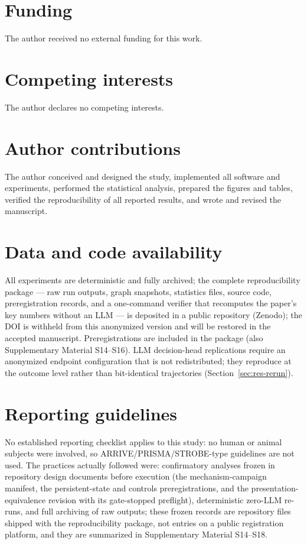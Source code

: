\documentclass[10pt]{article}
\begin{document}

\section*{Funding}
The author received no external funding for this work.

\section*{Competing interests}
The author declares no competing interests.

\section*{Author contributions}
The author conceived and designed the study, implemented all software and experiments, performed the statistical analysis, prepared the figures and tables, verified the reproducibility of all reported results, and wrote and revised the manuscript.

\section*{Data and code availability}
All experiments are deterministic and fully archived; the complete reproducibility package --- raw run outputs, graph snapshots, statistics files, source code, preregistration records, and a one-command verifier that recomputes the paper's key numbers without an LLM --- is deposited in a public repository (Zenodo); the DOI is withheld from this anonymized version and will be restored in the accepted manuscript. Preregistrations are included in the package (also Supplementary Material S14--S16). LLM decision-head replications require an anonymized endpoint configuration that is not redistributed; they reproduce at the outcome level rather than bit-identical trajectories (Section~\ref{sec:res-rerun}).

\section*{Reporting guidelines}
No established reporting checklist applies to this study: no human or animal subjects were involved, so ARRIVE/PRISMA/STROBE-type guidelines are not used. The practices actually followed were: confirmatory analyses frozen in repository design documents before execution (the mechanism-campaign manifest, the persistent-state and controls preregistrations, and the presentation-equivalence revision with its gate-stopped preflight), deterministic zero-LLM re-runs, and full archiving of raw outputs; these frozen records are repository files shipped with the reproducibility package, not entries on a public registration platform, and they are summarized in Supplementary Material S14--S18.
\end{document}
